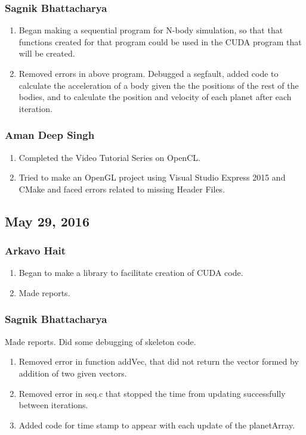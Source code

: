 \documentclass{article}
\begin{document}
\subsubsection*{Sagnik Bhattacharya}
\begin{enumerate}
	\item Began making a sequential program for N-body simulation, so that that functions created for that program could be used in the CUDA program that will be created.
	\item Removed errors in above program. Debugged a segfault, added code to calculate the acceleration of a body given the the positions of the rest of the bodies, and to calculate the position and velocity of each planet after each iteration.
\end{enumerate}
\subsubsection*{Aman Deep Singh}
\begin{enumerate}
    \item Completed the Video Tutorial Series on OpenCL.
    \item Tried to make an OpenGL project using Visual Studio Express 2015 and CMake and faced errors related to missing Header Files.
\end{enumerate}
\subsection*{May 29, 2016}
\subsubsection*{Arkavo Hait}
\begin{enumerate}
	\item Began to make a library to facilitate creation of CUDA code.
	\item Made reports.
\end{enumerate}
\subsubsection*{Sagnik Bhattacharya}
Made reports. Did some debugging of skeleton code.
\begin{enumerate}
	\item Removed error in function addVec, that did not return the vector formed by addition of two given vectors.
	\item Removed error in seq.c that stopped the time from updating successfully between iterations.
	\item Added code for time stamp to appear with each update of the planetArray.
\end{enumerate}
\end{document}
